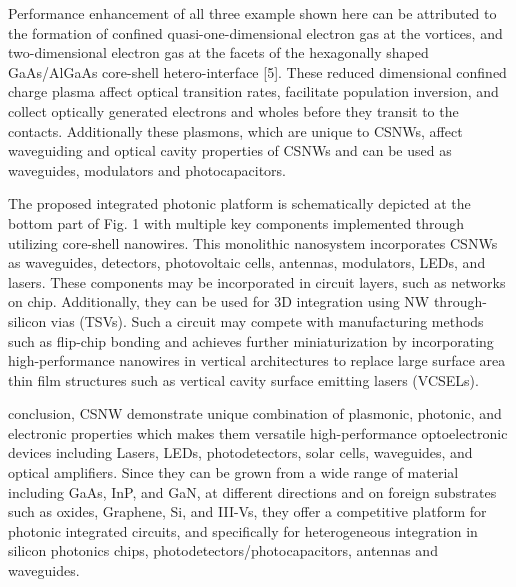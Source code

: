 Performance
enhancement of all three example shown here can be attributed to the
formation of confined quasi-one-dimensional electron gas at the
vortices, and two-dimensional electron gas at the facets of the
hexagonally shaped GaAs/AlGaAs core-shell hetero-interface {[}5{]}.
These reduced dimensional confined charge plasma affect optical
transition rates, facilitate population inversion, and collect optically
generated electrons and wholes before they transit to the contacts.
Additionally these plasmons, which are unique to CSNWs, affect
waveguiding and optical cavity properties of CSNWs and can be used as
waveguides, modulators and photocapacitors.

The proposed integrated photonic platform is schematically depicted at
the bottom part of Fig. 1 with multiple key components implemented
through utilizing core-shell nanowires. This monolithic nanosystem
incorporates CSNWs as waveguides, detectors, photovoltaic cells,
antennas, modulators, LEDs, and lasers. These components may be
incorporated in circuit layers, such as networks on chip. Additionally,
they can be used for 3D integration using NW through-silicon vias
(TSVs). Such a circuit may compete with manufacturing methods such as
flip-chip bonding and achieves further miniaturization by incorporating
high-performance nanowires in vertical architectures to replace large
surface area thin film structures such as vertical cavity surface
emitting lasers (VCSELs).

conclusion, CSNW demonstrate unique combination of plasmonic, photonic,
and electronic properties which makes them versatile high-performance
optoelectronic devices including Lasers, LEDs, photodetectors, solar
cells, waveguides, and optical amplifiers. Since they can be grown from
a wide range of material including GaAs, InP, and GaN, at different
directions and on foreign substrates such as oxides, Graphene, Si, and
III-Vs, they offer a competitive platform for photonic integrated
circuits, and specifically for heterogeneous integration in silicon
photonics chips, photodetectors/photocapacitors, antennas and
waveguides.

